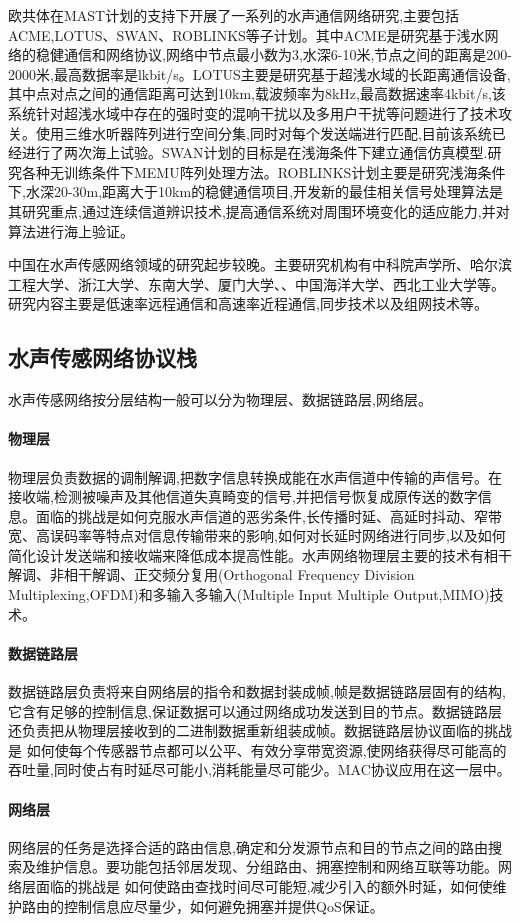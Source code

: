欧共体在MAST计划的支持下开展了一系列的水声通信网络研究,主要包括ACME,LOTUS、SWAN、ROBLINKS等子计划。其中ACME是研究基于浅水网络的稳健通信和网络协议,网络中节点最小数为3,水深6-10米,节点之间的距离是200-2000米,最高数据率是lkbit/s。LOTUS主要是研究基于超浅水域的长距离通信设备,其中点对点之间的通信距离可达到10km,载波频率为8kHz,最高数据速率4kbit/s,该系统针对超浅水域中存在的强时变的混响干扰以及多用户干扰等问题进行了技术攻关。使用三维水听器阵列进行空间分集,同时对每个发送端进行匹配,目前该系统已经进行了两次海上试验。SWAN计划的目标是在浅海条件下建立通信仿真模型.研究各种无训练条件下MEMU阵列处理方法。ROBLINKS计划主要是研究浅海条件下,水深20-30m,距离大于10km的稳健通信项目,开发新的最佳相关信号处理算法是其研究重点,通过连续信道辨识技术,提高通信系统对周围环境变化的适应能力,并对算法进行海上验证。

中国在水声传感网络领域的研究起步较晚。主要研究机构有中科院声学所、哈尔滨工程大学、浙江大学、东南大学、厦门大学、、中国海洋大学、西北工业大学等。研究内容主要是低速率远程通信和高速率近程通信,同步技术以及组网技术等。

\subsection{水声传感网络协议栈}
水声传感网络按分层结构一般可以分为物理层、数据链路层,网络层。
\paragraph{物理层}
物理层负责数据的调制解调,把数字信息转换成能在水声信道中传输的声信号。在接收端,检测被噪声及其他信道失真畸变的信号,并把信号恢复成原传送的数字信息。面临的挑战是如何克服水声信道的恶劣条件,长传播时延、高延时抖动、窄带宽、高误码率等特点对信息传输带来的影响,如何对长延时网络进行同步,以及如何简化设计发送端和接收端来降低成本提高性能。水声网络物理层主要的技术有相干解调、非相干解调、正交频分复用(Orthogonal Frequency Division Multiplexing,OFDM)和多输入多输入(Multiple Input Multiple Output,MIMO)技术。
\paragraph{数据链路层}
数据链路层负责将来自网络层的指令和数据封装成帧,帧是数据链路层固有的结构,它含有足够的控制信息,保证数据可以通过网络成功发送到目的节点。数据链路层还负责把从物理层接收到的二进制数据重新组装成帧。数据链路层协议面临的挑战是
如何使每个传感器节点都可以公平、有效分享带宽资源,使网络获得尽可能高的吞吐量,同时使占有时延尽可能小,消耗能量尽可能少。MAC协议应用在这一层中。
\paragraph{网络层}
网络层的任务是选择合适的路由信息,确定和分发源节点和目的节点之间的路由搜索及维护信息。要功能包括邻居发现、分组路由、拥塞控制和网络互联等功能。网络层面临的挑战是
如何使路由查找时间尽可能短,减少引入的额外时延，如何使维护路由的控制信息应尽量少，如何避免拥塞并提供QoS保证。



